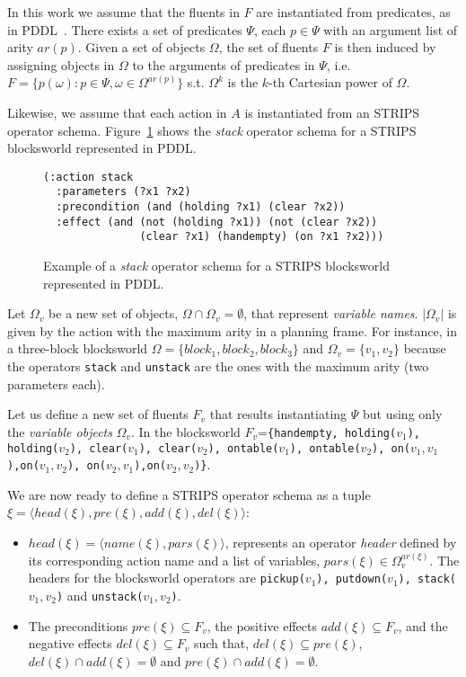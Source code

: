\documentclass[letterpaper]{article} %
\newcommand{\tup}[1]{{\langle #1 \rangle}}
\begin{document}
In this work we assume that the fluents in $F$ are instantiated from predicates, as in PDDL~\cite{mcdermott1998pddl,fox2003pddl2}. There exists a set of predicates $\Psi$, each $p\in\Psi$ with an argument list of arity $ar(p)$. Given a set of objects $\Omega$, the set of fluents $F$ is then induced by assigning objects in $\Omega$ to the arguments of predicates in $\Psi$, i.e.~$F=\{p(\omega):p\in\Psi,\omega\in\Omega^{ar(p)}\}$ s.t. $\Omega^k$ is the $k$-th Cartesian power of $\Omega$.

Likewise, we assume that each action in $A$ is instantiated from an STRIPS operator schema. Figure~\ref{fig:stack} shows the {\em stack} operator schema for a STRIPS blocksworld represented in PDDL.
\begin{figure}[hbt]
\begin{footnotesize}
\begin{scriptsize}
\begin{verbatim}
(:action stack
  :parameters (?x1 ?x2)
  :precondition (and (holding ?x1) (clear ?x2))
  :effect (and (not (holding ?x1)) (not (clear ?x2))
               (clear ?x1) (handempty) (on ?x1 ?x2)))
\end{verbatim}
\end{scriptsize}
\end{footnotesize}
 \caption{\small Example of a {\em stack} operator schema for a STRIPS blocksworld represented in PDDL.}
\label{fig:stack}
\end{figure}

Let $\Omega_v$ be a new set of objects, $\Omega\cap\Omega_v=\emptyset$, that represent {\em variable names}. $|\Omega_v|$ is given by the action with the maximum arity in a planning frame. For instance, in a three-block blocksworld $\Omega=\{block_1, block_2, block_3\}$ and $\Omega_v=\{v_1, v_2\}$ because the operators {\small\tt stack} and {\small\tt unstack} are the ones with the maximum arity (two parameters each). 

Let us define a new set of fluents $F_{v}$ that results instantiating $\Psi$ but using only the {\em variable objects} $\Omega_v$. In the blocksworld $F_v$={\small\tt\{handempty, holding($v_1$), holding($v_2$), clear($v_1$), clear($v_2$), ontable($v_1$), ontable($v_2$), on($v_1,v_1$),on($v_1,v_2$), on($v_2,v_1$),on($v_2,v_2$)\}}.

We are now ready to define a STRIPS operator schema as a tuple $\xi=\tup{head(\xi),pre(\xi),add(\xi),del(\xi)}$:
\begin{itemize}
\item $head(\xi)=\tup{name(\xi),pars(\xi)}$, represents an operator {\em header} defined by its corresponding action name and a list of variables, $pars(\xi)\in\Omega_v^{ar(\xi)}$. The headers for the blocksworld operators are {\small\tt pickup($v_1$), putdown($v_1$), stack($v_1,v_2$)} and {\small\tt unstack($v_1,v_2$)}.
\item The preconditions $pre(\xi)\subseteq F_v$, the positive effects $add(\xi)\subseteq F_v$, and the negative effects $del(\xi)\subseteq F_v$ such that, $del(\xi)\subseteq pre(\xi)$, $del(\xi)\cap add(\xi)=\emptyset$ and $pre(\xi)\cap add(\xi)=\emptyset$.
\end{itemize}
\end{document}

